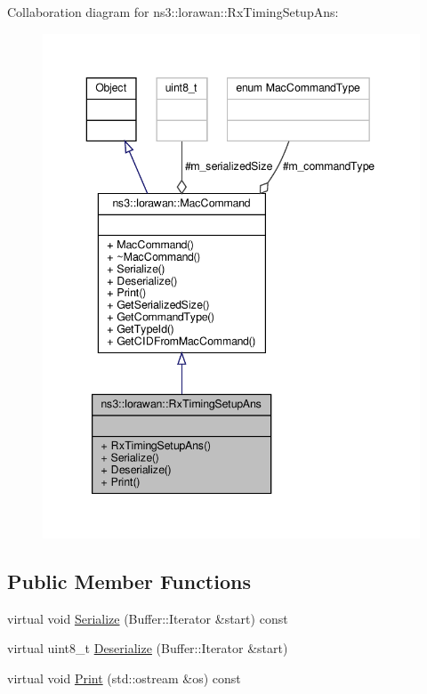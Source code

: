 Collaboration diagram for ns3\+:\+:lorawan\+:\+:Rx\+Timing\+Setup\+Ans\+:
\nopagebreak
\begin{figure}[H]
\begin{center}
\leavevmode
\includegraphics[width=343pt]{classns3_1_1lorawan_1_1RxTimingSetupAns__coll__graph}
\end{center}
\end{figure}
\subsection*{Public Member Functions}
\begin{DoxyCompactItemize}
\item 
virtual void \hyperlink{classns3_1_1lorawan_1_1RxTimingSetupAns_a582c4325ac60d1708a20717cbd713d1f}{Serialize} (Buffer\+::\+Iterator \&start) const
\item 
virtual uint8\+\_\+t \hyperlink{classns3_1_1lorawan_1_1RxTimingSetupAns_afe32bdb5e12970affb01835f692c96c4}{Deserialize} (Buffer\+::\+Iterator \&start)
\item 
virtual void \hyperlink{classns3_1_1lorawan_1_1RxTimingSetupAns_a477b8b609277cd43f5cd85696e8aae06}{Print} (std\+::ostream \&os) const
\end{DoxyCompactItemize}

